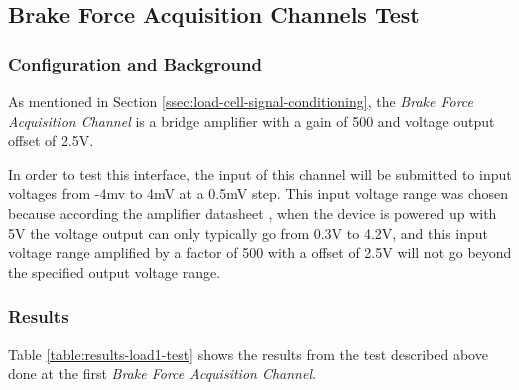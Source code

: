 \subsection{Brake Force Acquisition Channels Test}\label{sec:brake-pressure-acquisition-channels-test}

	\subsubsection{Configuration and Background}

		As mentioned in Section \ref{ssec:load-cell-signal-conditioning}, the \textit{Brake Force Acquisition Channel} is a bridge amplifier with a gain of 500 and voltage output offset of 2.5V.
		\par
		In order to test this interface, the input of this channel will be submitted to input voltages from -4mv to 4mV at a 0.5mV step. This input voltage range was chosen because according the amplifier datasheet \cite{ina125}, when the device is powered up with 5V the voltage output can only typically go from 0.3V to 4.2V, and this input voltage range amplified by a factor of 500 with a offset of 2.5V will not go beyond the specified output voltage range.
		
	\subsubsection{Results}


			Table \ref{table:results-load1-test} shows the results from the test described above done at the first \textit{Brake Force Acquisition Channel}.


